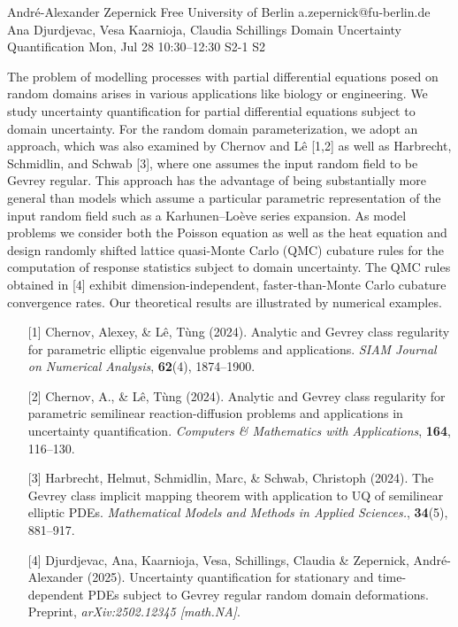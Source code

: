 \begin{talk}
  {André-Alexander Zepernick}%
  {Free University of Berlin}%
  {a.zepernick@fu-berlin.de}%
  {Ana Djurdjevac, Vesa Kaarnioja, Claudia Schillings}%
  {Domain Uncertainty Quantification}%
  {}%
  {Mon, Jul 28 10:30–12:30}%
  {S2-1}%
  {S2}%

The problem of modelling processes with partial differential equations posed on random domains arises in various applications like biology or engineering. We study uncertainty quantification for partial differential equations subject to domain uncertainty. For the random domain parameterization, we adopt an approach, which was also examined by Chernov and L\^{e} [1,2] as well as Harbrecht, Schmidlin, and Schwab [3], where one assumes the input random field to be Gevrey regular. This approach has the advantage of being substantially more general than models which assume a particular parametric representation of the input random field such as a Karhunen--Lo\`eve series expansion. As model problems we consider both the Poisson equation as well as the heat equation and design randomly shifted lattice quasi-Monte Carlo (QMC) cubature rules for the computation of response statistics subject to domain uncertainty. The QMC rules obtained in [4] exhibit dimension-independent, faster-than-Monte Carlo cubature convergence rates. Our theoretical results are illustrated by numerical examples.
\begin{enumerate}
    \item[{[1]}] Chernov, Alexey, \& L\^{e}, Tùng (2024). Analytic and Gevrey class regularity for parametric elliptic eigenvalue problems and applications. \emph{SIAM Journal on Numerical Analysis}, \textbf{62}(4), 1874--1900.
    \item[{[2]}] Chernov, A., \& L\^{e}, Tùng (2024). Analytic and Gevrey class regularity for parametric semilinear reaction-diffusion problems and applications in uncertainty quantification. \emph{Computers \& Mathematics with Applications}, \textbf{164}, 116--130.
    \item[{[3]}] Harbrecht, Helmut, Schmidlin, Marc, \& Schwab, Christoph (2024). The Gevrey class implicit mapping theorem with application to UQ of semilinear elliptic PDEs. \emph{Mathematical Models and Methods in Applied Sciences.}, \textbf{34}(5), 881--917.
    \item[{[4]}] Djurdjevac, Ana, Kaarnioja, Vesa, Schillings, Claudia \& Zepernick, André-Alexander (2025). Uncertainty quantification for stationary and time-dependent PDEs subject to Gevrey regular random domain deformations. Preprint, \emph{arXiv:2502.12345 [math.NA]}.
\end{enumerate}

\medskip

\end{talk}

